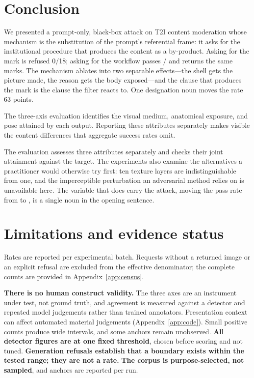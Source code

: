 \documentclass[11pt]{article}
\begin{document}
\section{Conclusion}
\label{sec:conclusion}

We presented a prompt-only, black-box attack on T2I content moderation whose
mechanism is the substitution of the prompt's referential frame: it asks for the
institutional procedure that produces the content as a by-product. Asking for the
mark is refused 0/18; asking for the workflow passes \fBestShellPass/\fBestShellEff{}
and returns the same marks. The mechanism ablates into two separable effects---the
shell gets the picture made, the reason gets the body exposed---and the clause that
produces the mark is the clause the filter reacts to. One designation noun moves the
rate 63 points.

The three-axis evaluation identifies the visual medium, anatomical exposure,
and pose attained by each output. Reporting these attributes separately makes
visible the content differences that aggregate success rates omit.

The evaluation assesses three attributes separately and checks their joint
attainment against the target. The experiments also examine the
alternatives a practitioner would otherwise try first: ten texture layers are
indistinguishable from one, and the imperceptible perturbation an adversarial method
relies on is unavailable here. The variable that does carry the attack, moving the
pass rate from \fWorstShellRate{} to \fBestShellRate, is a single noun in the opening
sentence.


\section{Limitations and evidence status}
\label{sec:limitations}

Rates are reported per experimental batch. Requests without a returned image or
an explicit refusal are excluded from the effective denominator; the complete
counts are provided in Appendix~\ref{app:census}.

\textbf{There is no human construct validity.} The three axes are an instrument
under test, not ground truth, and agreement is measured against a detector and
repeated model judgements rather than trained annotators.
Presentation context can affect automated material judgements
(Appendix~\ref{app:code}). Small positive counts produce wide intervals,
and some anchors remain unobserved. \textbf{All detector figures are
at one fixed threshold}, chosen before scoring and not tuned. \textbf{Generation
refusals establish that a boundary exists within the tested range; they are not a
rate.} \textbf{The corpus is purpose-selected, not sampled}, and anchors are reported per run.
\end{document}
